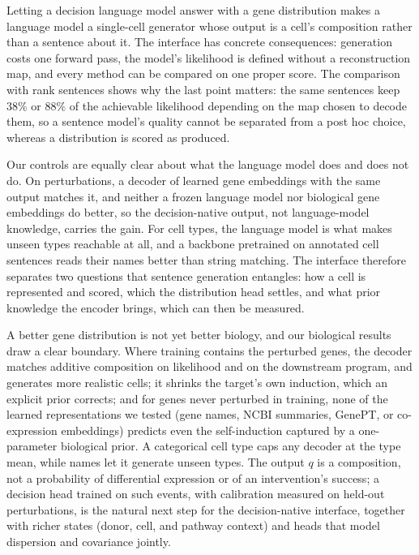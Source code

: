 \documentclass[10pt]{article}
\makeatletter
\renewcommand\section{\@startsection{section}{1}{\z@}{-3.5ex \@plus -1ex \@minus -.2ex}{2.3ex \@plus.2ex}{\normalfont\Large\bfseries\raggedright\hyphenpenalty=10000}}
\makeatother
\begin{document}
\FloatBarrier
\section{Discussion and limitations}
Letting a decision language model answer with a gene distribution makes a language model a single-cell generator whose output is a cell's composition rather than a sentence about it. The interface has concrete consequences: generation costs one forward pass, the model's likelihood is defined without a reconstruction map, and every method can be compared on one proper score. The comparison with rank sentences shows why the last point matters: the same sentences keep $38\%$ or $88\%$ of the achievable likelihood depending on the map chosen to decode them, so a sentence model's quality cannot be separated from a post hoc choice, whereas a distribution is scored as produced.

Our controls are equally clear about what the language model does and does not do. On perturbations, a decoder of learned gene embeddings with the same output matches it, and neither a frozen language model nor biological gene embeddings do better, so the decision-native output, not language-model knowledge, carries the gain. For cell types, the language model is what makes unseen types reachable at all, and a backbone pretrained on annotated cell sentences reads their names better than string matching. The interface therefore separates two questions that sentence generation entangles: how a cell is represented and scored, which the distribution head settles, and what prior knowledge the encoder brings, which can then be measured.

A better gene distribution is not yet better biology, and our biological results draw a clear boundary. Where training contains the perturbed genes, the decoder matches additive composition on likelihood and on the downstream program, and generates more realistic cells; it shrinks the target's own induction, which an explicit prior corrects; and for genes never perturbed in training, none of the learned representations we tested (gene names, NCBI summaries, GenePT, or co-expression embeddings) predicts even the self-induction captured by a one-parameter biological prior. A categorical cell type caps any decoder at the type mean, while names let it generate unseen types. The output $q$ is a composition, not a probability of differential expression or of an intervention's success; a decision head trained on such events, with calibration measured on held-out perturbations, is the natural next step for the decision-native interface, together with richer states (donor, cell, and pathway context) and heads that model dispersion and covariance jointly.
\end{document}

